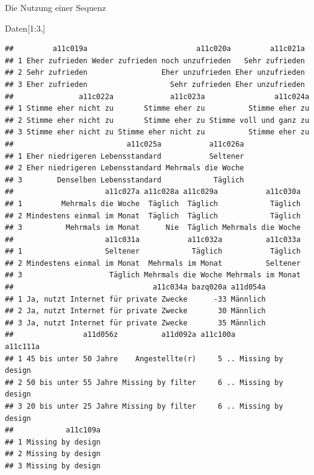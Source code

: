 \documentclass[ignorenonframetext,]{beamer}
\newenvironment{Shaded}{}{}
\newcommand{\DecValTok}[1]{\textcolor[rgb]{0.25,0.63,0.44}{{#1}}}
\newcommand{\NormalTok}[1]{{#1}}
\begin{document}
\begin{frame}[fragile]{Die Nutzung einer Sequenz}

\begin{Shaded}
\begin{Highlighting}[]
\NormalTok{Daten[}\DecValTok{1}\NormalTok{:}\DecValTok{3}\NormalTok{,]}
\end{Highlighting}
\end{Shaded}

\begin{verbatim}
##         a11c019a                         a11c020a         a11c021a
## 1 Eher zufrieden Weder zufrieden noch unzufrieden   Sehr zufrieden
## 2 Sehr zufrieden                 Eher unzufrieden Eher unzufrieden
## 3 Eher zufrieden                   Sehr zufrieden Eher unzufrieden
##               a11c022a             a11c023a                a11c024a
## 1 Stimme eher nicht zu       Stimme eher zu          Stimme eher zu
## 2 Stimme eher nicht zu       Stimme eher zu Stimme voll und ganz zu
## 3 Stimme eher nicht zu Stimme eher nicht zu          Stimme eher zu
##                          a11c025a           a11c026a
## 1 Eher niedrigeren Lebensstandard           Seltener
## 2 Eher niedrigeren Lebensstandard Mehrmals die Woche
## 3        Denselben Lebensstandard            Täglich
##                     a11c027a a11c028a a11c029a           a11c030a
## 1         Mehrmals die Woche  Täglich  Täglich            Täglich
## 2 Mindestens einmal im Monat  Täglich  Täglich            Täglich
## 3          Mehrmals im Monat      Nie  Täglich Mehrmals die Woche
##                     a11c031a           a11c032a          a11c033a
## 1                   Seltener            Täglich           Täglich
## 2 Mindestens einmal im Monat  Mehrmals im Monat          Seltener
## 3                    Täglich Mehrmals die Woche Mehrmals im Monat
##                                a11c034a bazq020a a11d054a
## 1 Ja, nutzt Internet für private Zwecke      -33 Männlich
## 2 Ja, nutzt Internet für private Zwecke       30 Männlich
## 3 Ja, nutzt Internet für private Zwecke       35 Männlich
##                a11d056z          a11d092a a11c100a          a11c111a
## 1 45 bis unter 50 Jahre    Angestellte(r)     5 .. Missing by design
## 2 50 bis unter 55 Jahre Missing by filter     6 .. Missing by design
## 3 20 bis unter 25 Jahre Missing by filter     6 .. Missing by design
##            a11c109a
## 1 Missing by design
## 2 Missing by design
## 3 Missing by design
\end{verbatim}

\end{frame}
\end{document}

